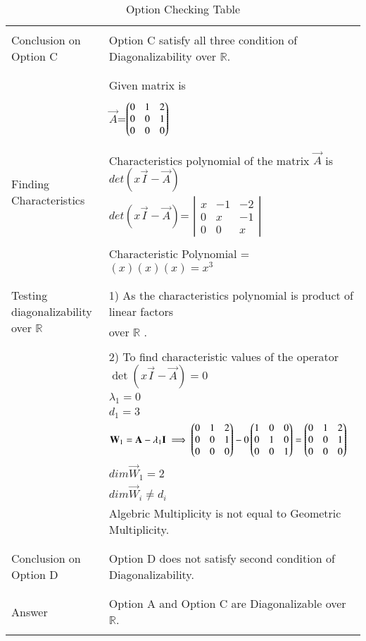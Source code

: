 \documentclass[journal,12pt]{IEEEtran}
\begin{document}
\begin{longtable}{|l|l|}
&\\
\hline
\multirow{3}{*}{Conclusion on Option C} & \\
& Option C satisfy all three condition of Diagonalizability over $\mathbb{R}$. \\
&\\
\hline\hline
\newpage
\hline
\multirow{3}{*}{Option D} & \\
& Given matrix is  \\
&\\
& $\vec{A}$=$\begin{pmatrix}0&1&2\\0&0&1\\0&0&0\end{pmatrix}$\\
&\\
\hline
\multirow{3}{*}{Finding Characteristics} & \\
&Characteristics polynomial of the matrix $\vec{A}$ is $det(x\vec{I}-\vec{A})$\\ 
polynomial
& $det(x\vec{I}-\vec{A})$= $\left|
                \begin{array}{ccc}
                x & -1 & -2\\
                0 & x & -1\\
                0 & 0 & x
                \end{array} \right|$  \\
&\\
& Characteristic Polynomial = $(x)(x)(x)=x^3$\\
&\\
\hline
\multirow{3}{*}{Testing diagonalizability over $\mathbb{R}$} & \\
& 1) As the characteristics  polynomial is product of linear factors\\
&over $\mathbb{R}$ .\\
&\\
&2) To find characteristic values of the operator $\det(x\vec{I}-\vec{A}) = 0$ \\
& $\lambda_1= 0$\\
&$d_1=3$\\
&$\mathbf{W}_1=\mathbf{A}-\lambda_1\mathbf{I}\implies\begin{pmatrix}0&1&2\\0&0&1\\0&0&0\end{pmatrix}-0\begin{pmatrix}1&0&0\\0&1&0\\0&0&1\end{pmatrix}=\begin{pmatrix}0&1&2\\0&0&1\\0&0&0\end{pmatrix}$\\

&$dim \vec{W}_1 = 2$\\
&$dim \vec{W}_i \neq d_i$\\
&Algebric Multiplicity is not equal to Geometric Multiplicity.\\
&\\
\hline
\multirow{3}{*}{Conclusion on Option D} & \\
& Option D  does not satisfy second condition of Diagonalizability.\\
&\\
\hline \hline
\multirow{3}{*}{Answer} & \\
&Option A and Option C are Diagonalizable over $\mathbb{R}$.\\

\hline
\caption{Option Checking Table}
\label{table:2}
\end{longtable}
\end{document}
